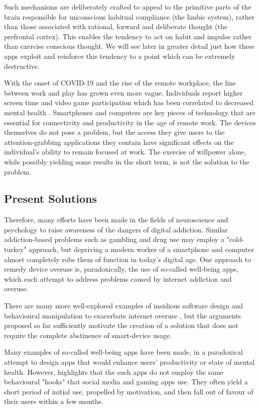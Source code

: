 Such mechanisms are deliberately crafted to appeal to the primitive parts of the brain responsible for unconscious habitual compliance (the limbic system), rather than those associated with rational, forward and deliberate thought (the prefrontal cortex). This enables the tendency to act on habit and impulse rather than exercise conscious thought. We will see later in greater detail just how these apps exploit and reinforce this tendency to a point which can be extremely destructive.

With the onset of COVID-19 and the rise of the remote workplace, the line between work and play has grown even more vague. Individuals report higher screen time and video game participation which has been correlated to decreased mental health \cite{colley2020exercise}. Smartphones and computers are key pieces of technology that are essential for connectivity and productivity in the age of remote work. The devices themselves do not pose a problem, but the access they give users to the attention-grabbing applications they contain have significant effects on the individual's ability to remain focused at work. The exercise of willpower alone, while possibly yielding some results in the short term, is not the solution to the problem.

\subsection{Present Solutions}
Therefore, many efforts have been made in the fields of neuroscience and psychology to raise awareness of the dangers of digital addiction. Similar addiction-based problems such as gambling and drug use may employ a "cold-turkey" approach, but depriving a modern worker of a smartphone and computer almost completely robs them of function in today's digital age. One approach to remedy device overuse is, paradoxically, the use of so-called well-being apps, which each attempt to address problems caused by internet addiction and overuse.

There are many more well-explored examples of insidious software design and behavioural manipulation to exacerbate internet overuse \cite{sagePaper2020}, but the arguments proposed so far sufficiently motivate the creation of a solution that does not require the complete abstinence of smart-device usage.

Many examples of so-called well-being apps have been made, in a paradoxical attempt to design apps that would enhance users' productivity or state of mental health. However, \cite{sagePaper2020} highlights that the such apps do not employ the same behavioural "hooks" that social media and gaming apps use. They often yield a short period of initial use, propelled by motivation, and then fall out of favour of their users within a few months.

